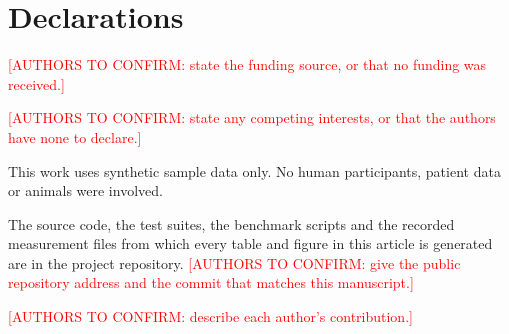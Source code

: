\documentclass[pdflatex,sn-mathphys-num]{sn-jnl}
\newcommand{\authorcheck}[1]{\textcolor{red}{[AUTHORS TO CONFIRM: #1]}}
\begin{document}
\title[Commitment-Bound Selective Disclosure for Health Records]{\papertitle}

\author*[1]{ }
\author[2]{ }


\abstract{}


\maketitle



\backmatter

\section*{Declarations}

 \authorcheck{state the funding source, or that no funding
was received.}

 \authorcheck{state any competing interests, or
that the authors have none to declare.}

 This work uses synthetic sample data only. No human
participants, patient data or animals were involved.

 The source code, the test suites, the
benchmark scripts and the recorded measurement files from which every table
and figure in this article is generated are in the project repository.
\authorcheck{give the public repository address and the commit that matches
this manuscript.}

 \authorcheck{describe each author's
contribution.}


\end{document}
